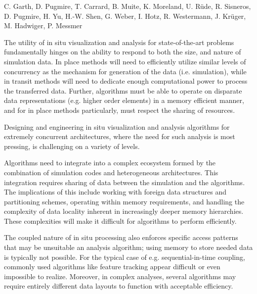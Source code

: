 
\license

 C. Garth, D. Pugmire, T. Carrard, B. Muite, K. Moreland, U. Rüde, R. Sisneros, D. Pugmire, H. Yu, H.-W. Shen, G. Weber, I. Hotz, R. Westermann, J. Krüger, M. Hadwiger, P. Messmer

\begin{refsection}

The utility of in situ visualization and analysis for state-of-the-art problems fundamentally hinges on the ability to respond to both the size, and nature of simulation data. In place methods will need to efficiently utilize similar levels of concurrency as the mechanism for generation of the data (i.e. simulation), while in transit methods will need to dedicate enough computational power to process the transferred data.  Further, algorithms must be able to operate on disparate data representations (e.g. higher order elements) in a memory efficient manner, and for in place methods particularly, must respect the sharing of resources.

Designing and engineering in situ visualization and analysis algorithms for extremely concurrent architectures, where the need for such analysis is most pressing, is challenging on a variety of levels.

Algorithms need to integrate into a complex ecosystem formed by the combination of simulation codes and heterogeneous architectures. This integration requires sharing of data between the simulation and the algorithms. The implications of this include working with foreign data structures and partitioning schemes, operating within memory requirements, and handling the complexity of data locality inherent in increasingly deeper memory hierarchies. These complexities will make it difficult for algorithms to perform efficiently.

The coupled nature of in situ processing also enforces specific access patterns that may be unsuitable an analysis algorithm; using memory to store needed data is typically not possible. For the typical case of e.g. sequential-in-time coupling, commonly used algorithms like feature tracking appear difficult or even impossible to realize. Moreover, in complex analyses, several algorithms may require entirely different data layouts to function with acceptable efficiency.


\end{refsection}
